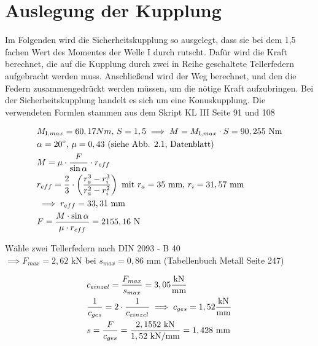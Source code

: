 \section{Auslegung der Kupplung}
Im Folgenden wird die Sicherheitskupplung so ausgelegt, dass sie bei dem 1,5 fachen Wert des Momentes der Welle I durch rutscht. Dafür wird die Kraft berechnet, die auf die Kupplung durch zwei in Reihe geschaltete Tellerfedern aufgebracht werden muss. Anschließend wird der Weg berechnet, und den die Federn zusammengedrückt werden müssen, um die nötige Kraft aufzubringen. Bei der Sicherheitskupplung handelt es sich um eine Konuskupplung. Die verwendeten Formlen stammen aus dem Skript KL III  Seite 91 und 108 


\begin{align*}
	&M_{\mathrm{I},max} = 60,17 Nm \text{, } S = 1,5 \implies M = M_{\mathrm{I},max} \cdot S = 90,255 \text{ Nm} \\
	&\alpha = 20 ^\circ \text{, } \mu = 0,43 \text{ (siehe Abb. 2.1, Datenblatt)} \\
	&M = \mu \cdot \frac{F}{\sin\alpha} \cdot r_{eff} \\
	&r_{eff} = \frac{2}{3} \cdot \left( \frac{r_a^3- r_i^3}{r_a^2 - r_i ^2} \right) \text{ mit } r_a = 35 \text{ mm, } r_i = 31,57 \text{ mm} \\
	&\implies r_{eff} = 33,31 \text{ mm} \\
	&F = \frac{M \cdot \sin\alpha}{\mu \cdot r_{eff}} = 2155,16 \text{ N}
\end{align*}

Wähle zwei Tellerfedern nach DIN 2093 - B 40 \\
$ \implies F_{max} = 2,62 $ kN bei $ s_{max} = 0,86 $ mm (Tabellenbuch Metall  Seite 247)

\begin{align*}
	&c_{einzel} = \frac{F_{max}}{s_{max}} = 3,05 \frac{\text{kN}}{\text{mm}} \\
	&\frac{1}{c_{ges}} = 2 \cdot \frac{1}{c_{einzel}} \implies c_{ges} = 1,52 \frac{\text{kN}}{\text{mm}}\\
	&s = \frac{F}{c_{ges}} = \frac{2,1552 \text{ kN}}{1,52 \text{ kN/mm}} = 1,428 \text{ mm}
\end{align*}

